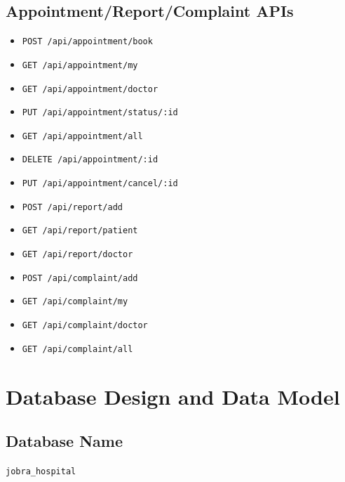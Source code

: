 \documentclass[12pt,a4paper]{article}
\begin{document}
\subsection{Appointment/Report/Complaint APIs}
\begin{itemize}[leftmargin=1.2cm]
    \item \texttt{POST /api/appointment/book}
    \item \texttt{GET /api/appointment/my}
    \item \texttt{GET /api/appointment/doctor}
    \item \texttt{PUT /api/appointment/status/:id}
    \item \texttt{GET /api/appointment/all}
    \item \texttt{DELETE /api/appointment/:id}
    \item \texttt{PUT /api/appointment/cancel/:id}
    \item \texttt{POST /api/report/add}
    \item \texttt{GET /api/report/patient}
    \item \texttt{GET /api/report/doctor}
    \item \texttt{POST /api/complaint/add}
    \item \texttt{GET /api/complaint/my}
    \item \texttt{GET /api/complaint/doctor}
    \item \texttt{GET /api/complaint/all}
\end{itemize}

\section{Database Design and Data Model}
\subsection{Database Name}
\texttt{jobra\_hospital}
\end{document}
